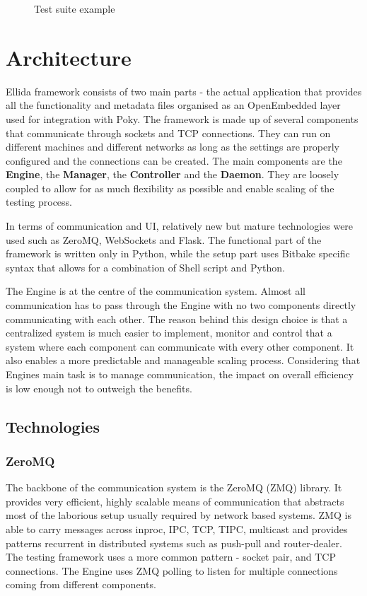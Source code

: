 \begin{figure}[htb!]
\begin{minipage}{0.48\textwidth}
	\caption{Test suite example}
    \end{minipage}
\end{figure}


\section{Architecture}
Ellida framework consists of two main parts - the actual application that provides all the functionality and  metadata files organised as an OpenEmbedded layer used for integration with Poky. The framework is made up of several components that communicate through sockets and TCP connections. They can run on different machines and different networks as long as the settings are properly configured and the connections can be created. The main components are the \textbf{Engine}, the \textbf{Manager}, the \textbf{Controller} and the \textbf{Daemon}. They are loosely coupled to allow for as much flexibility as possible and enable scaling of the testing process.

In terms of communication and UI, relatively new but mature technologies were used such as ZeroMQ, WebSockets and Flask. The functional part of the framework is written only in Python, while the setup part uses Bitbake specific syntax that allows for a combination of Shell script and Python.

The Engine is at the centre of the communication system. Almost all communication has to pass through the Engine with no two components directly communicating with each other. The reason behind this design choice is that a centralized system is much easier to implement, monitor and control that a system where each component can communicate with every other component. It also enables a more predictable and manageable scaling process. Considering that Engines main task is to manage communication, the impact on overall efficiency is low enough not to outweigh the benefits.

\subsection{Technologies}
\subsubsection*{ZeroMQ}
The backbone of the communication system is the ZeroMQ (ZMQ) library. It provides very efficient, highly scalable means of communication that abstracts most of the laborious setup usually required by network based systems. ZMQ is able to carry messages across inproc, IPC, TCP, TIPC, multicast and provides patterns recurrent in distributed systems such as push-pull and router-dealer. The testing framework uses a more common pattern - socket pair, and TCP connections. The Engine uses ZMQ polling to listen for multiple connections coming from different components.

